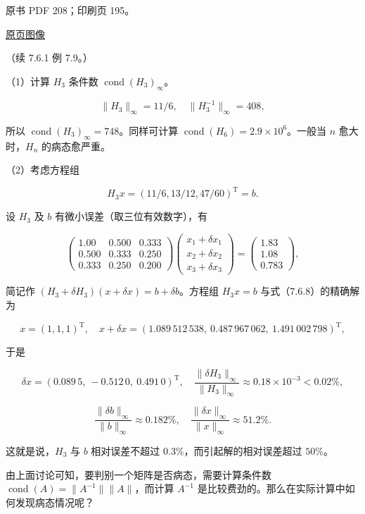 \documentclass[
  10pt,
  fontset=fandol]{ctexart}
\begin{document}
原书 PDF 208；印刷页 195。

\href{/Users/xiangjunfeng/Desktop/数值计算专用/numerical-analysis/book/source-images/pdf-208.jpeg}{原页图像}

（续 7.6.1 例 7.9。）

（1）计算 \(H_3\) 条件数 \(\operatorname{cond}(H_3)_\infty\)。

\[
\|H_3\|_\infty=11/6,\quad\|H_3^{-1}\|_\infty=408,
\]

所以 \(\operatorname{cond}(H_3)_\infty=748\)。同样可计算
\(\operatorname{cond}(H_6)=2.9\times10^6\)。一般当 \(n\) 愈大时，\(H_n\)
的病态愈严重。

（2）考虑方程组

\[
H_3x=(11/6,13/12,47/60)^{\mathrm T}=b.
\]

设 \(H_3\) 及 \(b\) 有微小误差（取三位有效数字），有

\[
\begin{pmatrix}
1.00&0.500&0.333\\
0.500&0.333&0.250\\
0.333&0.250&0.200
\end{pmatrix}
\begin{pmatrix}x_1+\delta x_1\\x_2+\delta x_2\\x_3+\delta x_3\end{pmatrix}
=\begin{pmatrix}1.83\\1.08\\0.783\end{pmatrix},
\tag{7.6.8}
\]

简记作 \((H_3+\delta H_3)(x+\delta x)=b+\delta b\)。方程组 \(H_3x=b\)
与式（7.6.8）的精确解为

\[
x=(1,1,1)^{\mathrm T},\quad
x+\delta x=(1.089\,512\,538,\ 0.487\,967\,062,\ 1.491\,002\,798)^{\mathrm T},
\]

于是

\[
\delta x=(0.089\,5,\ -0.512\,0,\ 0.491\,0)^{\mathrm T},\quad
\frac{\|\delta H_3\|_\infty}{\|H_3\|_\infty}\approx0.18\times10^{-3}<0.02\%,
\]

\[
\frac{\|\delta b\|_\infty}{\|b\|_\infty}\approx0.182\%,\quad
\frac{\|\delta x\|_\infty}{\|x\|_\infty}\approx51.2\%.
\]

这就是说，\(H_3\) 与 \(b\) 相对误差不超过
\(0.3\%\)，而引起解的相对误差超过 \(50\%\)。

由上面讨论可知，要判别一个矩阵是否病态，需要计算条件数
\(\operatorname{cond}(A)=\|A^{-1}\|\|A\|\)，而计算 \(A^{-1}\)
是比较费劲的。那么在实际计算中如何发现病态情况呢？
\end{document}
